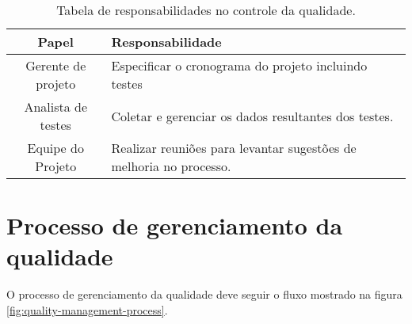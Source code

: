 
\begin{table}[H]
	\begin{tabularx}{\textwidth}{| c | X |}
		\hline
		\textbf{Papel}     & \textbf{Responsabilidade}                            \\
		\hline
		Gerente de projeto & Especificar o cronograma do projeto incluindo testes \\
		\hline
		Analista de testes & Coletar e gerenciar os dados resultantes dos testes. \\ %
		\hline
		Equipe do Projeto & Realizar reuniões para levantar sugestões de melhoria no processo. \\
		\hline
	\end{tabularx}
	\centering
	\caption{Tabela de responsabilidades no controle da qualidade.}
	\label{tab:responsability-quality-control}
\end{table}

\section{Processo de gerenciamento da qualidade}

O processo de gerenciamento da qualidade deve seguir o fluxo mostrado na figura \ref{fig:quality-management-process}.

